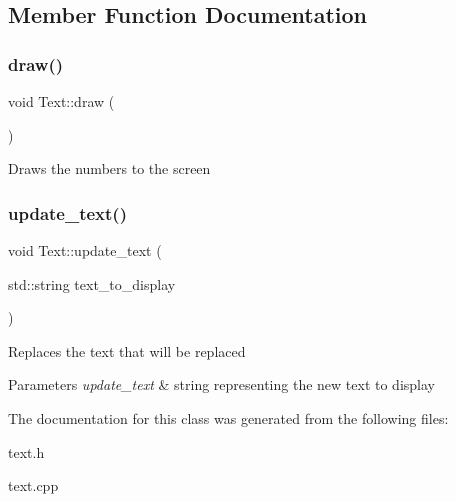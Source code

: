 \subsection{Member Function Documentation}
\mbox{\label{class_text_adedc069a9ad622bf9d2cf6d194a01b39}} 
\subsubsection{\texorpdfstring{draw()}{draw()}}
{\footnotesize\ttfamily void Text\+::draw (\begin{DoxyParamCaption}{ }\end{DoxyParamCaption})}

Draws the numbers to the screen \mbox{\label{class_text_ae3fc12110b4324c661aa3d279d71159c}} 
\subsubsection{\texorpdfstring{update\+\_\+text()}{update\_text()}}
{\footnotesize\ttfamily void Text\+::update\+\_\+text (\begin{DoxyParamCaption}\item[{std\+::string}]{text\+\_\+to\+\_\+display }\end{DoxyParamCaption})}

Replaces the text that will be replaced 
\begin{DoxyParams}{Parameters}
{\em update\+\_\+text} & string representing the new text to display \\
\hline
\end{DoxyParams}


The documentation for this class was generated from the following files\+:\begin{DoxyCompactItemize}
\item 
text.\+h\item 
text.\+cpp\end{DoxyCompactItemize}
